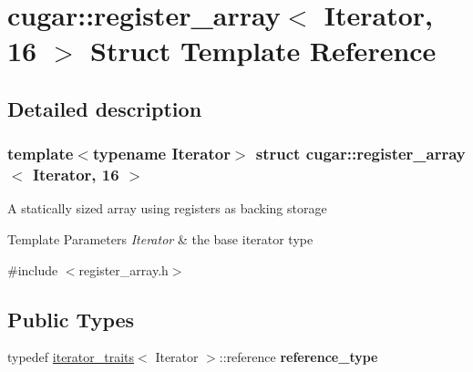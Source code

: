 \hypertarget{structcugar_1_1register__array_3_01_iterator_00_0116_01_4}{}\section{cugar\+:\+:register\+\_\+array$<$ Iterator, 16 $>$ Struct Template Reference}
\label{structcugar_1_1register__array_3_01_iterator_00_0116_01_4}


\subsection{Detailed description}
\subsubsection*{template$<$typename Iterator$>$\newline
struct cugar\+::register\+\_\+array$<$ Iterator, 16 $>$}

A statically sized array using registers as backing storage


\begin{DoxyTemplParams}{Template Parameters}
{\em Iterator} & the base iterator type \\
\hline
\end{DoxyTemplParams}


{\ttfamily \#include $<$register\+\_\+array.\+h$>$}

\subsection*{Public Types}
\begin{DoxyCompactItemize}
\item 
\mbox{\label{structcugar_1_1register__array_3_01_iterator_00_0116_01_4_aab664ebe0a46a26d451e2781cd6efb8e}} 
typedef \hyperlink{structcugar_1_1iterator__traits}{iterator\+\_\+traits}$<$ Iterator $>$\+::reference {\bfseries reference\+\_\+type}
\end{DoxyCompactItemize}
